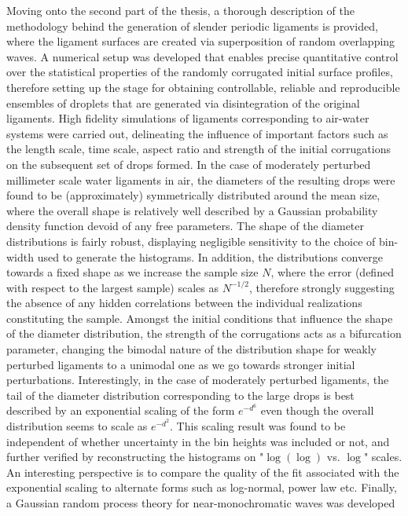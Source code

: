 Moving onto the second part of the thesis, a thorough description of the 
methodology behind the generation of slender periodic ligaments is provided, 
where the ligament surfaces are created via superposition of random overlapping waves.
A numerical setup was developed that enables precise quantitative control over the 
statistical properties of the randomly corrugated initial surface profiles, 
therefore setting up the stage for obtaining controllable, reliable and reproducible 
ensembles of droplets that are generated via disintegration of the original ligaments.
High fidelity simulations of ligaments corresponding to air-water systems were carried out,
delineating the influence of important factors such as the length scale, time scale, 
aspect ratio and strength of the initial corrugations on the subsequent set of drops formed.  
In the case of moderately perturbed millimeter scale water ligaments in air, 
the diameters of the resulting drops were found to be (approximately) symmetrically 
distributed around the mean size, where the overall shape is relatively well described by 
a Gaussian probability density function devoid of any free parameters.
The shape of the diameter distributions is fairly robust, displaying negligible sensitivity
to the choice of bin-width used to generate the histograms.
In addition, the distributions converge towards a fixed shape as we increase the sample size $N$, 
where the error (defined with respect to the largest sample) scales as $N^{-1/2}$, therefore strongly 
suggesting the absence of any hidden correlations between the individual realizations constituting the sample. 
Amongst the initial conditions that influence the shape of the diameter distribution, the strength of 
the corrugations acts as a bifurcation parameter, changing the bimodal nature of the distribution shape for 
weakly perturbed ligaments to a unimodal one as we go towards stronger initial perturbations. 
Interestingly, in the case of moderately perturbed ligaments, the tail of the diameter 
distribution corresponding to the large drops is best described by an exponential scaling of
the form $e^{-d^6}$ even though the overall distribution seems to scale as $e^{-d^2}$. 
This scaling result was found to be independent of whether uncertainty in the bin heights
was included or not, and further verified by reconstructing the histograms on "$\log(\log)$ vs. $\log$" scales.      
An interesting perspective is to compare the quality of the fit associated with 
the exponential scaling to alternate forms such as log-normal, power law etc.  
Finally, a Gaussian random process theory for near-monochromatic waves was developed 
